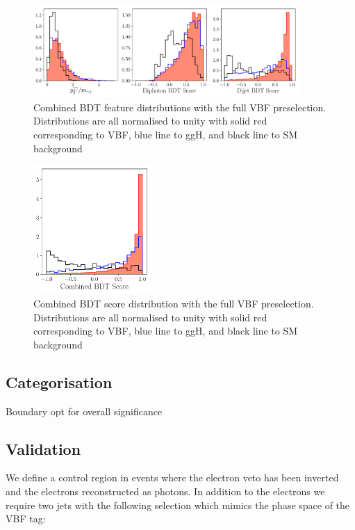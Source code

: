 \begin{figure}[h!]
    \includegraphics[width=0.90\textwidth]{figures/event_selection/combined_BDT_features_PS.pdf}
    \caption{Combined BDT feature distributions with the full VBF preselection. Distributions are all normalised to unity with solid red corresponding to VBF, blue line to ggH, and black line to SM background}
    \label{fig:event_categorisaton:combined_bdt_features}
\end{figure}

\begin{figure}[h!]
    \includegraphics[width=0.4\textwidth]{figures/event_selection/combined_BDT_score.pdf}
    \caption{Combined BDT score distribution with the full VBF preselection. Distributions are all normalised to unity with solid red corresponding to VBF, blue line to ggH, and black line to SM background}
    \label{fig:event_categorisaton:combined_bdt_features}
\end{figure}





\subsection{Categorisation}
Boundary opt for overall significance


\subsection{Validation}
We define a control region in \Zee events where the electron veto has been inverted and the electrons reconstructed as photons. In addition to the electrons we require two jets with the following selection which mimics the phase space of the VBF tag:

